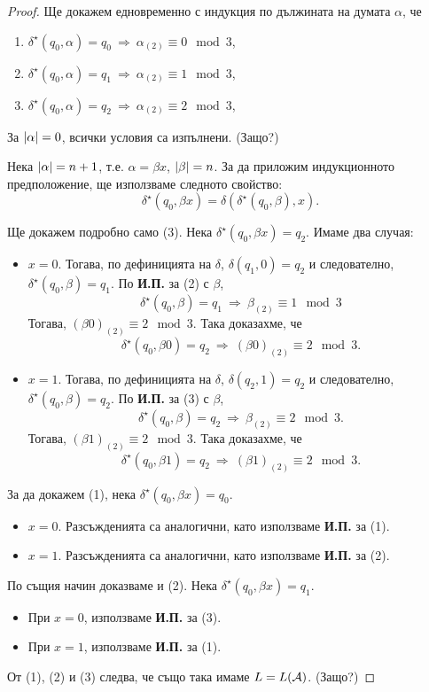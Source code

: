 \begin{proof}
  Ще докажем едновременно с индукция по дължината на думата $\alpha$, че
  \begin{enumerate}[(1)]
  \item 
    $\delta^\star(q_0,\alpha) = q_0\ \Rightarrow\ \alpha_{(2)} \equiv 0 \mod 3$,
  \item 
    $\delta^\star(q_0,\alpha) = q_1\ \Rightarrow\ \alpha_{(2)} \equiv 1 \mod 3$,
  \item 
    $\delta^\star(q_0,\alpha) = q_2\ \Rightarrow\ \alpha_{(2)} \equiv 2 \mod 3$,
  \end{enumerate}
  
  За $\vert{\alpha}\vert = 0$, всички условия са изпълнени. (Защо?)
  
  Нека $\vert{\alpha}\vert = n+1$, т.е. $\alpha = \beta x$, $\vert{\beta}\vert = n$.
  За да приложим индукционното предположение, ще използваме следното свойство:
  \[\delta^\star(q_0,\beta x) = \delta(\delta^\star(q_0,\beta),x).\]
  
  Ще докажем подробно само (3).
  Нека $\delta^\star(q_0,\beta x) = q_2$. 
  Имаме два случая:
  \begin{itemize}
  \item 
    $x = 0$. 
    Тогава, по дефиницията на $\delta$, 
    $\delta(q_1,0) = q_2$ и следователно, $\delta^\star(q_0,\beta) = q_1$.
    По {\bf И.П.} за (2) с $\beta$,
    \[\delta^\star(q_0,\beta) = q_1\ \Rightarrow\ \beta_{(2)} \equiv 1 \mod 3\]
    Тогава, $(\beta0)_{(2)} \equiv 2 \mod 3$. Така доказахме, че
    \[\delta^\star(q_0,\beta 0) = q_2\ \Rightarrow\ (\beta 0)_{(2)} \equiv 2 \mod 3.\]
  \item
    $x = 1$.
    Тогава, по дефиницията на $\delta$, $\delta(q_2,1) = q_2$ и следователно,
    $\delta^\star(q_0,\beta) = q_2$.
    По {\bf И.П.} за (3) с $\beta$,
    \[\delta^\star(q_0,\beta) = q_2\ \Rightarrow\ \beta_{(2)} \equiv 2 \mod 3.\]
    Тогава, $(\beta1)_{(2)} \equiv 2 \mod 3$. Така доказахме, че
    \[\delta^\star(q_0,\beta 1) = q_2\ \Rightarrow\ (\beta 1)_{(2)} \equiv 2 \mod 3.\]
  \end{itemize}
  
  За да докажем (1), нека $\delta^\star(q_0,\beta x) = q_0$. 
  \begin{itemize}
  \item 
    $x = 0$. Разсъжденията са аналогични, като използваме {\bf И.П.} за (1).
  \item
    $x = 1$. Разсъжденията са аналогични, като използваме {\bf И.П.} за (2).
  \end{itemize}
  
  По същия начин доказваме и (2). Нека $\delta^\star(q_0,\beta x) = q_1$. 
  \begin{itemize}
  \item 
    При $x = 0$, използваме {\bf И.П.} за (3).
  \item
    При $x = 1$, използваме {\bf И.П.} за (1).
  \end{itemize}

  От (1), (2) и (3) следва, че също така имаме $L = L(\mathcal{A})$. (Защо?)
\end{proof}


